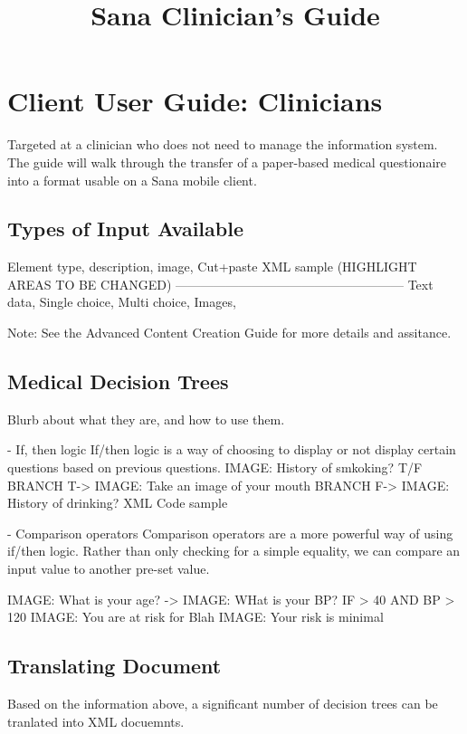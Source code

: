 \documentclass[a4paper,10pt]{article}
\title{Sana Clinician's Guide}
\author{}
\begin{document}
\maketitle

\begin{abstract}

\end{abstract}

\section{Client User Guide: Clinicians}
Targeted at a clinician who does not need to manage the information system. The guide will walk through the transfer of a paper-based medical questionaire into a format usable on a Sana mobile client. 

\subsection{Types of Input Available}
Element type, description, image, Cut+paste XML sample  (HIGHLIGHT AREAS TO BE CHANGED)
------------------------------------------------------
Text data,  
Single choice,  
Multi choice,  
Images,

Note: See the Advanced Content Creation Guide for more details and assitance. 

\subsection{Medical Decision Trees}
Blurb about what they are, and how to use them.

- If, then logic
If/then logic is a way of choosing to display or not display certain questions based on previous questions. 
{IMAGE: History of smkoking? T/F} BRANCH T-> {IMAGE: Take an image of your mouth} 
				  BRANCH F-> {IMAGE: History of drinking?}
XML Code sample

- Comparison operators
Comparison operators are a more powerful way of using if/then logic. Rather than only checking for a simple equality, we can compare an input value to another pre-set value. 

{IMAGE: What is your age?} ->  {IMAGE: WHat is your BP?} IF > 40  AND BP > 120 {IMAGE: You are at risk for Blah}
									       {IMAGE: Your risk is minimal}

\subsection{Translating Document}
Based on the information above, a significant number of decision trees can be tranlated into XML docuemnts. 
\end{document}
